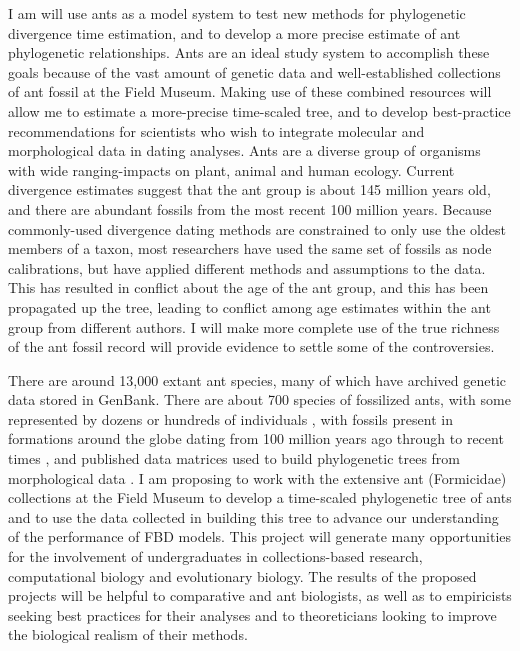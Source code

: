 \documentclass[]{article}
\begin{document}
    I am will use ants as a model system to test new methods for phylogenetic divergence time estimation, and to develop a more precise estimate of ant phylogenetic relationships. Ants are an ideal study system to accomplish these goals because of the vast amount of genetic data and well-established collections of ant fossil at the Field Museum. Making use of these combined resources will allow me to estimate a more-precise time-scaled tree, and to develop best-practice recommendations for scientists who wish to integrate molecular and morphological data in dating analyses. Ants are a diverse group of organisms with wide ranging-impacts on plant, animal and human ecology. Current divergence estimates suggest that the ant group is about 145 million years old, and there are abundant fossils from the most recent 100 million years. Because commonly-used divergence dating methods are constrained to only use the oldest members of a taxon, most researchers have used the same set of fossils as node calibrations, but have applied different methods and assumptions to the data. This has resulted in conflict about the age of the ant group, and this has been propagated up the tree, leading to conflict among age estimates within the ant group from different authors. I will make more complete use of the true richness of the ant fossil record will provide evidence to settle some of the controversies. \par
There are around 13,000 extant ant species, many of which have archived genetic data stored in GenBank. There are about 700 species of fossilized ants, with some represented by dozens or hundreds of individuals \citep{ref87}, with fossils present in formations around the globe dating from 100 million years ago through to recent times \citep{ref87}, and published data matrices used to build phylogenetic trees from morphological data \citep{urbani1992internal, grimaldi1997new, brady2005morphological}. I am proposing to work with the extensive ant (Formicidae) collections at the Field Museum to develop a time-scaled phylogenetic tree of ants and to use the data collected in building this tree to advance our understanding of the performance of FBD models. This project will generate many opportunities for the involvement of undergraduates in collections-based research, computational biology and evolutionary biology. The results of the proposed projects will be helpful to comparative and ant biologists, as well as to empiricists seeking best practices for their analyses and to theoreticians looking to improve the biological realism of their methods.\par
\end{document}
